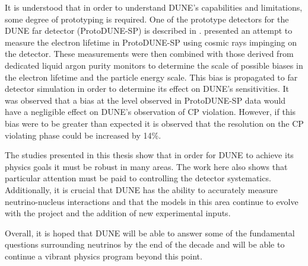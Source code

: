 It is understood that in order to understand DUNE's capabilities and limitations, some degree of prototyping is required.
One of the prototype detectors for the DUNE far detector (ProtoDUNE-SP) is described in .
 presented an attempt to measure the electron lifetime in ProtoDUNE-SP using cosmic rays impinging on the detector.
These measurements were then combined with those derived from dedicated liquid argon purity monitors to determine the scale of possible biases in the electron lifetime and the particle energy scale.
This bias is propagated to far detector simulation in order to determine its effect on DUNE's sensitivities.
It was observed that a bias at the level observed in ProtoDUNE-SP data would have a negligible effect on DUNE's observation of CP violation.
However, if this bias were to be greater than expected it is observed that the resolution on the CP violating phase could be increased by 14\%.

The studies presented in this thesis show that in order for DUNE to achieve its physics goals it must be robust in many areas.
The work here also shows that particular attention must be paid to controlling the detector systematics.
Additionally, it is crucial that DUNE has the ability to accurately measure neutrino-nucleus interactions and that the models in this area continue to evolve with the project and the addition of new experimental inputs.

Overall, it is hoped that DUNE will be able to answer some of the fundamental questions surrounding neutrinos by the end of the decade and will be able to continue a vibrant physics program beyond this point.
